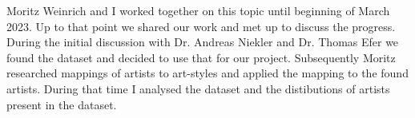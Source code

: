 

Moritz Weinrich and I worked together on this topic until beginning of March 2023. Up to that point we shared our work and met up to discuss the progress.
During the initial discussion with Dr. Andreas Niekler and Dr. Thomas Efer we found the dataset \autocite{poloclub-diffusiondb} and decided to use that for our project.
Subsequently Moritz researched mappings of artists to art-styles and applied the mapping to the found artists. 
During that time I analysed the \autocite{poloclub-diffusiondb} dataset and the distibutions of artists present in the dataset.